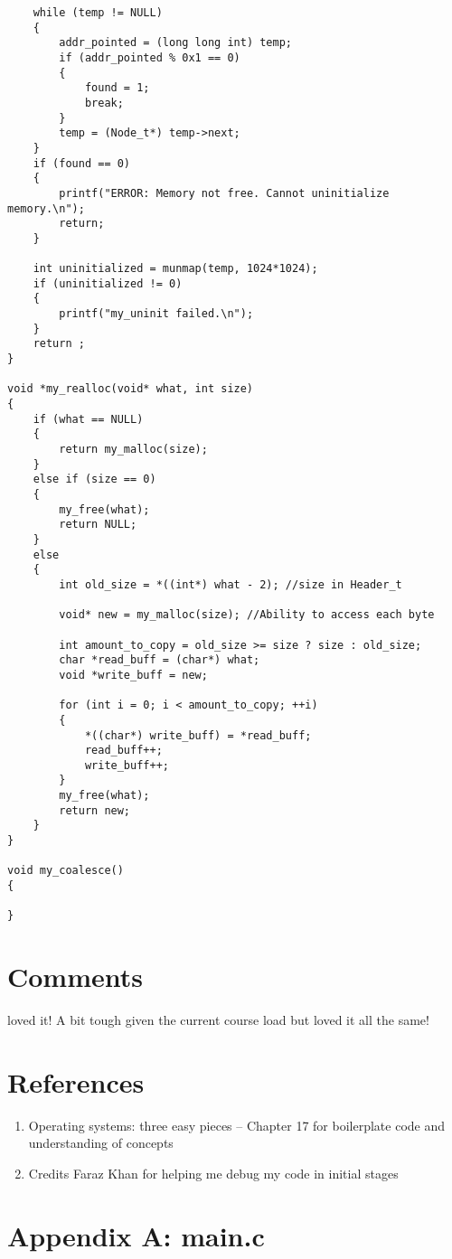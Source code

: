 \documentclass[a4paper]{article}
\begin{document}
\begin{verbatim}
	while (temp != NULL)
	{
		addr_pointed = (long long int) temp;
		if (addr_pointed % 0x1 == 0)
		{
			found = 1;
			break;
		}
		temp = (Node_t*) temp->next;
	}
	if (found == 0)
	{
		printf("ERROR: Memory not free. Cannot uninitialize memory.\n");
		return;
	}

	int uninitialized = munmap(temp, 1024*1024);
	if (uninitialized != 0)
	{
		printf("my_uninit failed.\n");
	}
	return ;
}

void *my_realloc(void* what, int size) 
{
	if (what == NULL)
	{
		return my_malloc(size);
	}
	else if (size == 0)
	{
		my_free(what);
		return NULL;
	}
	else
	{
		int old_size = *((int*) what - 2); //size in Header_t 
		
		void* new = my_malloc(size); //Ability to access each byte

		int amount_to_copy = old_size >= size ? size : old_size;
		char *read_buff = (char*) what; 
		void *write_buff = new;

		for (int i = 0; i < amount_to_copy; ++i)
		{
			*((char*) write_buff) = *read_buff;
			read_buff++; 
			write_buff++;
		}
		my_free(what);
		return new;
	}
}

void my_coalesce() 
{
    
}

\end{verbatim}

\newpage
\section*{Comments}

loved it! A bit tough given the current course load but loved it all the same!

\newpage
\section*{References}
\begin{enumerate}
    \item Operating systems: three easy pieces -- Chapter 17 for boilerplate code and understanding of concepts
    \item Credits Faraz Khan for helping me debug my code in initial stages
\end{enumerate}

\section*{Appendix A: main.c}
\end{document}
